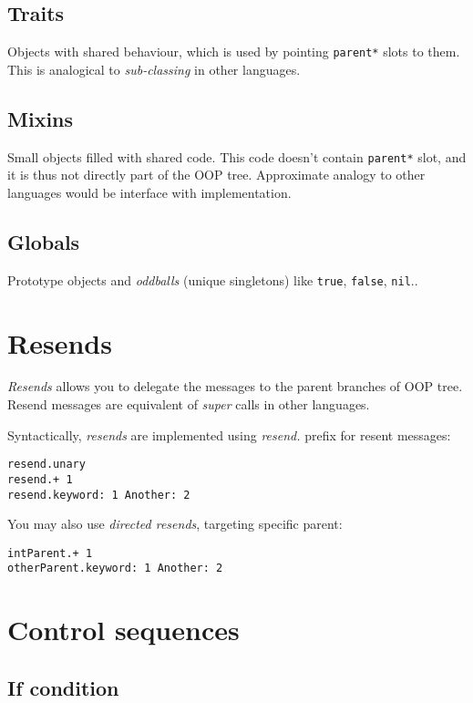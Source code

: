 \documentclass[10pt]{article}
\begin{document}
\begin{multicols*}{3}
\subsection{Traits}
Objects with shared behaviour, which is used by pointing \texttt{parent*} slots to them. This is analogical to \textit{sub-classing} in other languages.



\subsection{Mixins}

Small objects filled with shared code. This code doesn't contain \texttt{parent*} slot, and it is thus not directly part of the OOP tree. Approximate analogy to other languages would be interface with implementation.



\subsection{Globals}
Prototype objects and \textit{oddballs} (unique singletons) like \texttt{true}, \texttt{false}, \texttt{nil}..


\section{Resends}

\textit{Resends} allows you to delegate the messages to the parent branches of OOP tree. Resend messages are equivalent of \textit{super} calls in other languages.

Syntactically, \textit{resends} are implemented using \textit{resend.} prefix for resent messages:

\begin{lstlisting}
resend.unary
resend.+ 1
resend.keyword: 1 Another: 2
\end{lstlisting}

You may also use \textit{directed resends}, targeting specific parent:

\begin{lstlisting}
intParent.+ 1
otherParent.keyword: 1 Another: 2
\end{lstlisting}

\section{Control sequences}
\subsection{If condition}


\end{multicols*}
\end{document}

